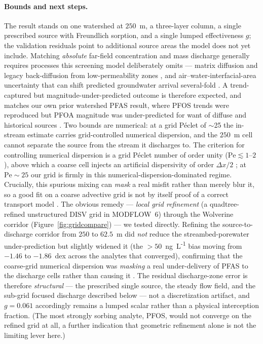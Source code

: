 \paragraph{Bounds and next steps.} The result stands on one watershed at $250$~m, a three-layer
column, a single prescribed source with Freundlich sorption, and a single lumped effectiveness $g$;
the validation residuals point to additional source areas the model does not yet include. Matching
\emph{absolute} far-field concentration and mass discharge generally requires processes this
screening model deliberately omits --- matrix diffusion and legacy back-diffusion from low-permeability
zones \citep{kulkarni2022}, and air--water-interfacial-area uncertainty that can shift predicted
groundwater arrival several-fold \citep{brusseau_guo2021}. A trend-captured but magnitude-under-predicted
outcome is therefore expected, and matches our own prior watershed PFAS result, where PFOS trends
were reproduced but PFOA magnitude was under-predicted for want of diffuse and historical sources
\citep{rafiei2023pfas}. Two bounds are numerical: at a grid
P\'eclet of $\sim$25 the in-stream estimate carries grid-controlled numerical dispersion, and the
$250$~m cell cannot separate the source from the stream it discharges to. The criterion for
controlling numerical dispersion is a grid P\'eclet number of order unity ($\mathrm{Pe}\lesssim1$--$2$),
above which a coarse cell injects an artificial dispersivity of order $\Delta x/2$
\citep{zheng_bennett2002,anderson2015}; at $\mathrm{Pe}\sim25$ our grid is firmly in this
numerical-dispersion-dominated regime. Crucially, this spurious mixing can \emph{mask} a real misfit
rather than merely blur it, so a good fit on a coarse advective grid is not by itself proof of a
correct transport model \citep{benson2017}. The obvious remedy --- \emph{local grid refinement} (a
quadtree-refined unstructured DISV grid in MODFLOW~6) through the Wolverine corridor
(Figure~\ref{fig:gridcompare}) --- we tested directly. Refining the source-to-discharge corridor from
$250$ to $62.5$~m did \emph{not} reduce the streambed-porewater under-prediction but slightly widened
it (the $>50$~ng~L\textsuperscript{-1} bias moving from $-1.46$ to $-1.86$~dex across the analytes that
converged), confirming that the coarse-grid numerical dispersion was \emph{masking} a real
under-delivery of PFAS to the discharge cells rather than causing it \citep{benson2017}. The residual
discharge-zone error is therefore \emph{structural} --- the prescribed single source, the steady flow
field, and the sub-grid focused discharge described below --- not a discretization artifact, and
$g=0.061$ accordingly remains a lumped scalar rather than a physical interception fraction. (The most
strongly sorbing analyte, PFOS, would not converge on the refined grid at all, a further indication
that geometric refinement alone is not the limiting lever here.)

